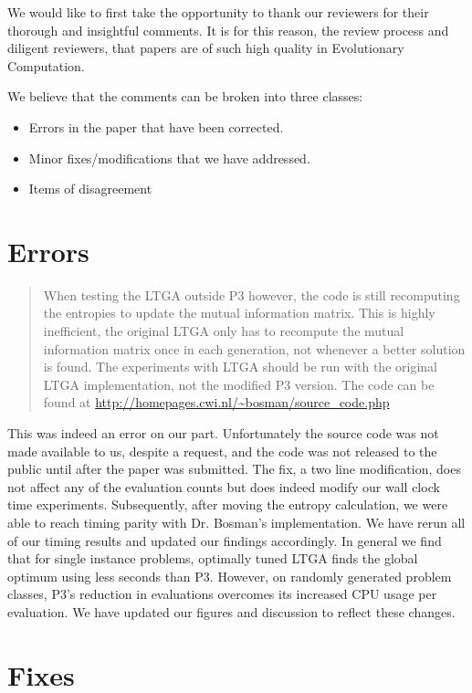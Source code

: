 \documentclass[]{article}
\begin{document}
We would like to first take the opportunity to thank our reviewers for their thorough and insightful comments. It is for this reason, the review process and diligent reviewers, that papers are of such high quality in Evolutionary Computation.

We believe that the comments can be broken into three classes:
\begin{itemize}
\item Errors in the paper that have been corrected.
\item Minor fixes/modifications that we have addressed.
\item Items of disagreement
\end{itemize}

\section{Errors}
\begin{quote}
 When testing the LTGA outside P3 however, the code is still recomputing the entropies to update the mutual information matrix. This is highly inefficient, the original LTGA only has to recompute the mutual information matrix once in each generation, not whenever a better solution is found. The experiments with LTGA should be run with the original LTGA implementation, not the modified P3 version. The code can be found at \url{http://homepages.cwi.nl/~bosman/source_code.php}
\end{quote}

This was indeed an error on our part. Unfortunately the source code was not made available to us, despite a request,
and the code was not released to the public until after the paper was submitted. The fix,
a two line modification, does not affect any of the evaluation counts but does indeed modify our
wall clock time experiments. Subsequently, after moving the entropy calculation,
we were able to reach timing parity with Dr. Bosman's implementation. We have rerun all of our timing results
and updated our findings accordingly. In general we find that for single instance problems,
optimally tuned LTGA %
finds the global optimum using less seconds than P3. However, on randomly generated problem classes,
P3's reduction in evaluations overcomes its increased CPU usage per evaluation.
We have updated our figures and discussion to reflect these changes.

\section{Fixes}
\end{document}
